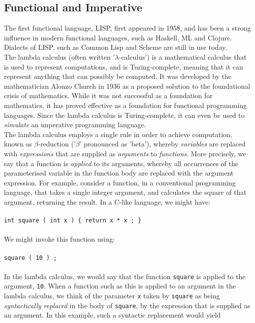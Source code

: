\documentclass{article}
\begin{document}
\subsection{Functional and Imperative}
The first functional language, LISP, first appeared in 1958, and has been a strong influence in modern functional languages, such as Haskell, ML and Clojure. Dialects of LISP, such as Common Lisp and Scheme are still in use today.
\\\indent The lambda calculus (often written '$\lambda$-calculus') is a mathematical calculus that is used to represent computations, and is Turing-complete, meaning that it can represent anything that can possibly be computed. It was developed by the mathematician Alonzo Church in 1936 as a proposed solution to the foundational crisis of mathematics. While it was not successful as a foundation for mathematics, it has proved effective as a foundation for functional programming languages. Since the lambda calculus is Turing-complete, it can even be used to \emph{simulate} an imperative programming language.
\\\indent The lambda calculus employs a single rule in order to achieve computation, known as $\beta$-reduction ('$\beta$' pronounced as 'beta'), whereby \emph{variables} are replaced with \emph{expressions} that are supplied as \emph{arguments} to \emph{functions}. More precisely, we say that a function is \emph{applied} to its arguments, whereby all occurrences of the parameterised variable in the function body are replaced with the argument expression. For example, consider a function, in a conventional programming language, that takes a single integer argument, and calculates the square of that argument, returning the result. In a C-like language, we might have:
\\\\
\indent \texttt{int square ( int x ) \{ return x * x ; \}}
\\\\
We might invoke this function using:
\\\\
\indent \texttt{square ( 10 ) ;}
\\\\
In the lambda calculus, we would say that the function \texttt{square} is applied to the argument, \texttt{10}. When a function such as this is applied to an argument in the lambda calculus, we think of the parameter \texttt{x} taken by \texttt{square} as being \emph{syntactically replaced} in the body of \texttt{square}, by the expression that is supplied as an argument. In this example, such a syntactic replacement would yield
\end{document}
